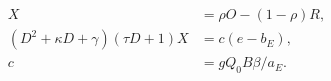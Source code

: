 \documentclass{article}
\begin{document}
\fontsize{22}{29}\selectfont
\[
\begin{aligned}X&=\rho O-(1-\rho)R,\\(D^2+\kappa D+\gamma)(\tau D+1)X&=c(e-b_E),\\c&=gQ_0B\beta/a_E.\end{aligned}
\]
\end{document}
